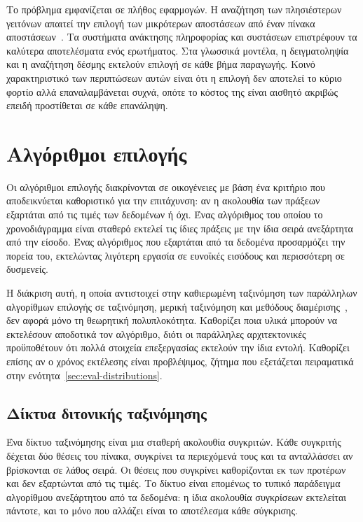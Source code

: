 Το πρόβλημα εμφανίζεται σε πλήθος εφαρμογών. Η αναζήτηση των 
πλησιέστερων γειτόνων απαιτεί την επιλογή των μικρότερων αποστάσεων από έναν
πίνακα αποστάσεων~\cite{sismanis2012}. Τα συστήματα ανάκτησης πληροφορίας και
συστάσεων επιστρέφουν τα  καλύτερα αποτελέσματα ενός ερωτήματος. Στα
γλωσσικά μοντέλα, η δειγματοληψία  και η αναζήτηση δέσμης εκτελούν
επιλογή σε κάθε βήμα παραγωγής. Κοινό χαρακτηριστικό των περιπτώσεων αυτών είναι
ότι η επιλογή δεν αποτελεί το κύριο φορτίο αλλά επαναλαμβάνεται συχνά, οπότε το
κόστος της είναι αισθητό ακριβώς επειδή προστίθεται σε κάθε επανάληψη.

\section{Αλγόριθμοι επιλογής}
\label{sec:bg-algorithms}

Οι αλγόριθμοι επιλογής διακρίνονται σε οικογένειες με βάση ένα κριτήριο που
αποδεικνύεται καθοριστικό για την επιτάχυνση: αν η ακολουθία των πράξεων
εξαρτάται από τις τιμές των δεδομένων ή όχι. Ένας αλγόριθμος του οποίου το
χρονοδιάγραμμα είναι σταθερό εκτελεί τις ίδιες πράξεις με την ίδια σειρά
ανεξάρτητα από την είσοδο. Ένας αλγόριθμος που εξαρτάται από τα δεδομένα
προσαρμόζει την πορεία του, εκτελώντας λιγότερη εργασία σε ευνοϊκές εισόδους και
περισσότερη σε δυσμενείς.

Η διάκριση αυτή, η οποία αντιστοιχεί στην καθιερωμένη ταξινόμηση των παράλληλων
αλγορίθμων επιλογής σε ταξινόμηση, μερική ταξινόμηση και μεθόδους
διαμέρισης~\cite{zhang2023gputopk}, δεν αφορά μόνο τη θεωρητική πολυπλοκότητα. Καθορίζει ποια υλικά
μπορούν να εκτελέσουν αποδοτικά τον αλγόριθμο, διότι οι παράλληλες αρχιτεκτονικές
προϋποθέτουν ότι πολλά στοιχεία επεξεργασίας εκτελούν την ίδια εντολή. Καθορίζει
επίσης αν ο χρόνος εκτέλεσης είναι προβλέψιμος, ζήτημα που εξετάζεται πειραματικά
στην ενότητα~\ref{sec:eval-distributions}.

\subsection{Δίκτυα διτονικής ταξινόμησης}
\label{sec:bg-bitonic}

Ένα δίκτυο ταξινόμησης είναι μια σταθερή ακολουθία συγκριτών. Κάθε συγκριτής
δέχεται δύο θέσεις του πίνακα, συγκρίνει τα περιεχόμενά τους και τα ανταλλάσσει
αν βρίσκονται σε λάθος σειρά. Οι θέσεις που συγκρίνει καθορίζονται εκ των
προτέρων και δεν εξαρτώνται από τις τιμές. Το δίκτυο είναι επομένως το τυπικό
παράδειγμα αλγορίθμου ανεξάρτητου από τα δεδομένα: η ίδια ακολουθία συγκρίσεων
εκτελείται πάντοτε, και το μόνο που αλλάζει είναι το αποτέλεσμα κάθε σύγκρισης.

